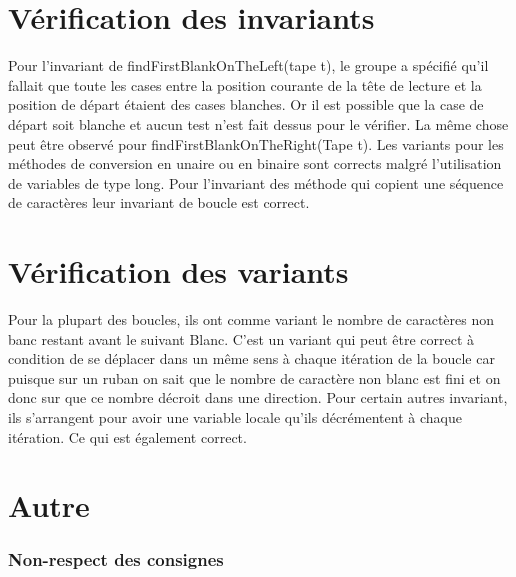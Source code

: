 \documentclass[a4paper,11pt]{article}
\begin{document}
\section{Vérification des invariants}
Pour l'invariant de findFirstBlankOnTheLeft(tape t), le groupe a spécifié qu'il fallait que toute les cases entre la position courante de la tête de lecture et la position de départ étaient des cases blanches. Or il est possible que la case de départ soit blanche et aucun test n'est fait dessus pour le vérifier. 
La même chose peut être observé pour findFirstBlankOnTheRight(Tape t).
Les variants pour les méthodes de conversion en unaire ou en binaire sont corrects malgré l'utilisation de variables de type long. Pour l'invariant des méthode qui copient une séquence de caractères leur invariant de boucle est correct.
\section{Vérification des variants}
Pour la plupart des boucles, ils ont comme variant le nombre de caractères non banc restant avant le suivant Blanc. C'est un variant qui peut être correct à condition de se déplacer dans un même sens à chaque itération de la boucle car puisque sur un ruban on sait que le nombre de caractère non blanc est fini et on donc sur que ce nombre décroit dans une direction.
Pour certain autres invariant, ils s'arrangent pour avoir une variable locale qu'ils décrémentent à chaque itération. Ce qui est également correct.
\section{Autre}

    \subsubsection{Non-respect des consignes}
\end{document}
